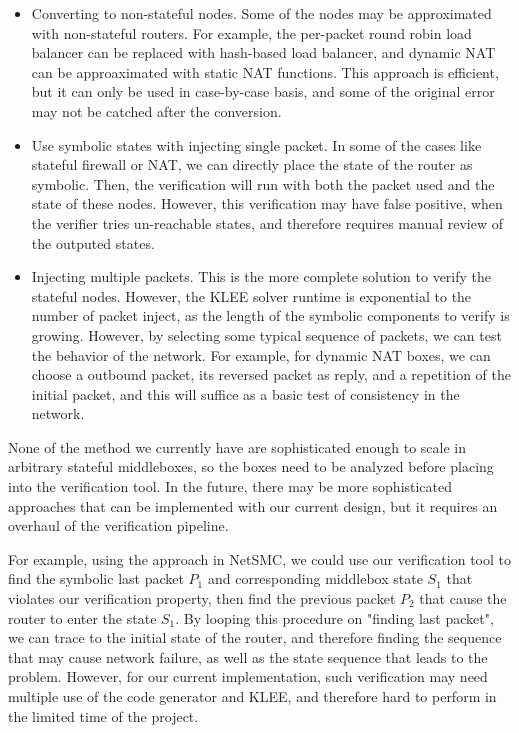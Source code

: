 \documentclass[letterpaper, 10 pt, conference]{ieeeconf}  %
\begin{document}
\begin{itemize}
  \item Converting to non-stateful nodes. 
  Some of the nodes may be approximated with non-stateful routers. 
  For example, the per-packet round robin load balancer can be replaced with hash-based load balancer, and dynamic NAT can be approaximated with static NAT functions. 
  This approach is efficient, but it can only be used in case-by-case basis, and some of the original error may not be catched after the conversion. 
  \item Use symbolic states with injecting single packet. 
  In some of the cases like stateful firewall or NAT, we can directly place the state of the router as symbolic. 
  Then, the verification will run with both the packet used and the state of these nodes. 
  However, this verification may have false positive, when the verifier tries un-reachable states, and therefore requires manual review of the outputed states. 
  \item Injecting multiple packets. 
  This is the more complete solution to verify the stateful nodes. 
  However, the KLEE solver runtime is exponential to the number of packet inject, as the length of the symbolic components to verify is growing. 
  However, by selecting some typical sequence of packets, we can test the behavior of the network. 
  For example, for dynamic NAT boxes, we can choose a outbound packet, its reversed packet as reply, and a repetition of the initial packet, and this will suffice as a basic test of consistency in the network. 
\end{itemize}

None of the method we currently have are sophisticated enough to scale in arbitrary stateful middleboxes, so the boxes need to be analyzed before placing into the verification tool. 
In the future, there may be more sophisticated approaches that can be implemented with our current design, but it requires an overhaul of the verification pipeline. 

For example, using the approach in NetSMC\cite{NetSMC}, we could use our verification tool to find the symbolic last packet $P_1$ and corresponding middlebox state $S_1$ that violates our verification property, 
then find the previous packet $P_2$ that cause the router to enter the state $S_1$. 
By looping this procedure on "finding last packet", we can trace to the initial state of the router, and therefore finding the sequence that may cause network failure, as well as the state sequence that leads to the problem.
However, for our current implementation, such verification may need multiple use of the code generator and KLEE, and therefore hard to perform in the limited time of the project.
\end{document}
